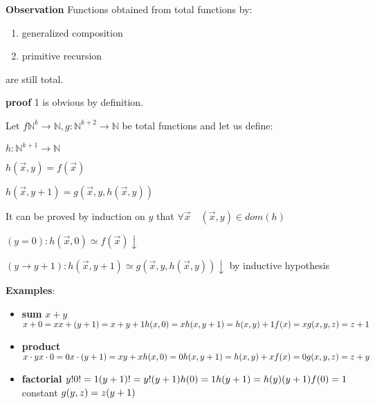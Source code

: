 \documentclass{amsbook}
\newcommand{\nat}{\ensuremath{\mathbb{N}}}
\theoremstyle{definition}
\theoremstyle{remark}
\numberwithin{section}{chapter}
\numberwithin{equation}{chapter}
\begin{document}
\textbf{Observation}
Functions obtained from total functions by:
\begin{enumerate}
	\item generalized composition
	\item primitive recursion
\end{enumerate}
are still total.

\textbf{proof}
1 is obvious by definition.

Let $f\nat^k\rightarrow\nat, g:\nat^{k+2}\rightarrow\nat$ be total functions and let us define:

$h: \nat^{k+1} \rightarrow \nat$

$h(\vec{x},y) = f(\vec{x})$

$h(\vec{x},y+1) = g(\vec{x},y,h(\vec{x},y))$

It can be proved by induction on $y$ that $\forall \vec{x} \quad (\vec{x},y) \in dom(h)$

$(y=0): h(\vec{x},0) \simeq f(\vec{x})\downarrow$

$(y\rightarrow y+1): h(\vec{x},y+1) \simeq g(\vec{x},y,h(\vec{x},y))\downarrow$ by inductive hypothesis

\textbf{Examples}:

\begin{itemize}
	\item \textbf{sum} $x+y$\\
	      $x+0 = x\\
		      x+(y+1) = x+y+1\\\\
		      h(x,0) = x\\
		      h(x,y+1) = h(x,y)+1\\\\
		      f(x) = x\\
		      g(x,y,z) = z+1$
	\item \textbf{product}
	      $x\cdot y\\
		      x\cdot 0 = 0\\
		      x\cdot (y+1) = xy+x\\
		      \\
		      h(x,0) = 0\\
		      h(x,y+1) = h(x,y)+x\\
		      \\
		      f(x) = 0\\
		      g(x,y,z) = z+y$
	\item \textbf{factorial}
	      $y!\\
		      0! = 1\\
		      (y+1)! = y!(y+1)\\
		      \\
		      h(0) = 1\\
		      h(y+1) = h(y)(y+1)\\
		      \\
		      f(0) = 1$ constant $\\
		      g(y,z) = z(y+1)$
\end{itemize}
\end{document}
